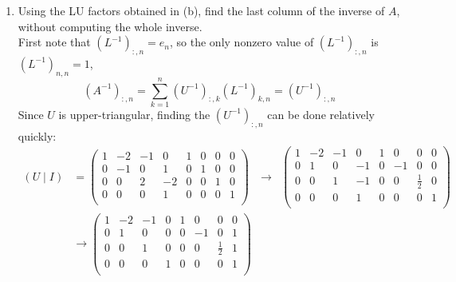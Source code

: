 \documentclass[11pt]{article}
\newcommand{\n}{\vspace{0.3cm}}
\begin{document}
\begin{enumerate}
\begin{enumerate}
		      \item Using the LU factors obtained in (b), find the last column of the inverse of \(A\), without computing the whole inverse. \n\\
		            First note that \((L^{-1})_{:,n} = e_n\), so the only nonzero value of \((L^{-1})_{:,n}\) is \((L^{-1})_{n,n} = 1\),
		            \[(A^{-1})_{:,n} = \sum_{k=1}^n (U^{-1})_{:,k}(L^{-1})_{k,n} = (U^{-1})_{:,n}\]
		            Since \(U\) is upper-triangular, finding the \((U^{-1})_{:,n}\) can be done relatively quickly:
		            \begin{align*}
			            (U \mid I) & = \left(\begin{array}{rrrr|rrrr}
					                                 1 & -2 & -1 & 0  & 1 & 0 & 0 & 0 \\
					                                 0 & -1 & 0  & 1  & 0 & 1 & 0 & 0 \\
					                                 0 & 0  & 2  & -2 & 0 & 0 & 1 & 0 \\
					                                 0 & 0  & 0  & 1  & 0 & 0 & 0 & 1 \\
				                                 \end{array}\right)
			                       & \to                                 &
			            \left(\begin{array}{rrrr|rrrr}
					                  1 & -2 & -1 & 0  & 1 & 0  & 0       & 0 \\
					                  0 & 1  & 0  & -1 & 0 & -1 & 0       & 0 \\
					                  0 & 0  & 1  & -1 & 0 & 0  & \frac12 & 0 \\
					                  0 & 0  & 0  & 1  & 0 & 0  & 0       & 1 \\
				                  \end{array}\right)         \\
			                       & \to
			            \left(\begin{array}{rrrr|rrrr}
					                  1 & -2 & -1 & 0 & 1 & 0  & 0       & 0 \\
					                  0 & 1  & 0  & 0 & 0 & -1 & 0       & 1 \\
					                  0 & 0  & 1  & 0 & 0 & 0  & \frac12 & 1 \\
					                  0 & 0  & 0  & 1 & 0 & 0  & 0       & 1 \\
				                  \end{array}\right)

\end{align*}
\end{enumerate}
\end{enumerate}
\end{document}
